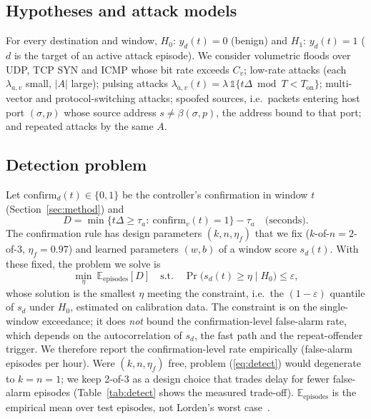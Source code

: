 \documentclass[conference]{IEEEtran}
\begin{document}
\subsection{Hypotheses and attack models}
For every destination and window, $H_0$: $y_d(t)=0$ (benign) and $H_1$: $y_d(t)=1$ ($d$ is the target of an active attack episode). We consider volumetric floods over UDP, TCP SYN and ICMP whose bit rate exceeds $C_v$; low-rate attacks (each $\lambda_{a,v}$ small, $|A|$ large); pulsing attacks $\lambda_{a,v}(t)=\lambda\,\mathbb{1}\{t\Delta \bmod T<T_{\text{on}}\}$; multi-vector and protocol-switching attacks; spoofed sources, i.e.\ packets entering host port $(\sigma,p)$ whose source address $s\neq\beta(\sigma,p)$, the address bound to that port; and repeated attacks by the same $A$.

\subsection{Detection problem}
Let $\mathrm{confirm}_d(t)\in\{0,1\}$ be the controller's confirmation in window $t$ (Section~\ref{sec:method}) and
\begin{equation}
D=\min\{t\Delta\ge\tau_a:\ \mathrm{confirm}_v(t)=1\}-\tau_a \quad\text{(seconds)}.
\end{equation}
The confirmation rule has design parameters $(k,n,\eta_f)$ that we fix ($k$-of-$n=2$-of-$3$, $\eta_f=0.97$) and learned parameters $(w,b)$ of a window score $s_d(t)$. With these fixed, the problem we solve is
\begin{equation}
\min_{\eta}\ \mathbb{E}_{\text{episodes}}[D]\quad\text{s.t.}\quad \Pr\big(s_d(t)\ge\eta\mid H_0\big)\le\varepsilon, \label{eq:detect}
\end{equation}
whose solution is the smallest $\eta$ meeting the constraint, i.e.\ the $(1-\varepsilon)$ quantile of $s_d$ under $H_0$, estimated on calibration data. The constraint is on the single-window exceedance; it does \emph{not} bound the confirmation-level false-alarm rate, which depends on the autocorrelation of $s_d$, the fast path and the repeat-offender trigger. We therefore report the confirmation-level rate empirically (false-alarm episodes per hour). Were $(k,n,\eta_f)$ free, problem (\ref{eq:detect}) would degenerate to $k=n=1$; we keep 2-of-3 as a design choice that trades delay for fewer false-alarm episodes (Table~\ref{tab:detect} shows the measured trade-off). $\mathbb{E}_{\text{episodes}}$ is the empirical mean over test episodes, not Lorden's worst case~\cite{lorden1971procedures}.
\end{document}
